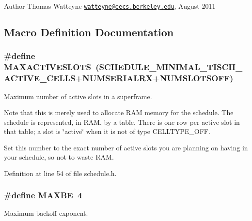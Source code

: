 \begin{DoxyAuthor}{Author}
Thomas Watteyne \href{mailto:watteyne@eecs.berkeley.edu}{\tt watteyne@eecs.\+berkeley.\+edu}, August 2011 
\end{DoxyAuthor}


\subsection{Macro Definition Documentation}
\subsubsection[{\texorpdfstring{M\+A\+X\+A\+C\+T\+I\+V\+E\+S\+L\+O\+TS}{MAXACTIVESLOTS}}]{\setlength{\rightskip}{0pt plus 5cm}\#define M\+A\+X\+A\+C\+T\+I\+V\+E\+S\+L\+O\+TS~({\bf S\+C\+H\+E\+D\+U\+L\+E\+\_\+\+M\+I\+N\+I\+M\+A\+L\+\_\+T\+I\+S\+C\+H\+\_\+\+A\+C\+T\+I\+V\+E\+\_\+\+C\+E\+L\+LS}+{\bf N\+U\+M\+S\+E\+R\+I\+A\+L\+RX}+{\bf N\+U\+M\+S\+L\+O\+T\+S\+O\+FF})}\hypertarget{group___schedule_ga5b6f09fe180237288683a64602eb5a85}{}\label{group___schedule_ga5b6f09fe180237288683a64602eb5a85}


Maximum number of active slots in a superframe. 

Note that this is merely used to allocate R\+AM memory for the schedule. The schedule is represented, in R\+AM, by a table. There is one row per active slot in that table; a slot is \char`\"{}active\char`\"{} when it is not of type C\+E\+L\+L\+T\+Y\+P\+E\+\_\+\+O\+FF.

Set this number to the exact number of active slots you are planning on having in your schedule, so not to waste R\+AM. 

Definition at line 54 of file schedule.\+h.

\subsubsection[{\texorpdfstring{M\+A\+X\+BE}{MAXBE}}]{\setlength{\rightskip}{0pt plus 5cm}\#define M\+A\+X\+BE~4}\hypertarget{group___schedule_ga484b7be00a72295108c945848f750943}{}\label{group___schedule_ga484b7be00a72295108c945848f750943}


Maximum backoff exponent. 

